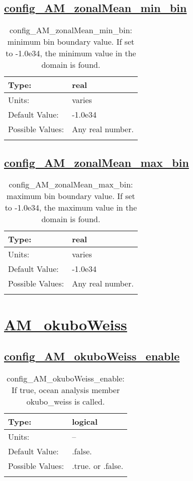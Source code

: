 \subsection[config\_AM\_zonalMean\_min\_bin]{\hyperref[sec:nm_tab_AM_zonalMean]{config\_AM\_zonalMean\_min\_bin}}
\label{subsec:nm_sec_config_AM_zonalMean_min_bin}
\begin{center}
\begin{longtable}{| p{2.0in} || p{4.0in} |}
    \hline
    Type: & real \\
    \hline
    Units: & \si{varies} \\
    \hline
    Default Value: & -1.0e34 \\
    \hline
    Possible Values: & Any real number. \\
    \hline
    \caption{config\_AM\_zonalMean\_min\_bin: minimum bin boundary value.  If set to -1.0e34, the minimum value in the domain is found.}
\end{longtable}
\end{center}
\subsection[config\_AM\_zonalMean\_max\_bin]{\hyperref[sec:nm_tab_AM_zonalMean]{config\_AM\_zonalMean\_max\_bin}}
\label{subsec:nm_sec_config_AM_zonalMean_max_bin}
\begin{center}
\begin{longtable}{| p{2.0in} || p{4.0in} |}
    \hline
    Type: & real \\
    \hline
    Units: & \si{varies} \\
    \hline
    Default Value: & -1.0e34 \\
    \hline
    Possible Values: & Any real number. \\
    \hline
    \caption{config\_AM\_zonalMean\_max\_bin: maximum bin boundary value.  If set to -1.0e34, the maximum value in the domain is found.}
\end{longtable}
\end{center}
\section[AM\_okuboWeiss]{\hyperref[sec:nm_tab_AM_okuboWeiss]{AM\_okuboWeiss}}
\label{sec:nm_sec_AM_okuboWeiss}
\subsection[config\_AM\_okuboWeiss\_enable]{\hyperref[sec:nm_tab_AM_okuboWeiss]{config\_AM\_okuboWeiss\_enable}}
\label{subsec:nm_sec_config_AM_okuboWeiss_enable}
\begin{center}
\begin{longtable}{| p{2.0in} || p{4.0in} |}
    \hline
    Type: & logical \\
    \hline
    Units: & -- \\
    \hline
    Default Value: & .false. \\
    \hline
    Possible Values: & .true. or .false. \\
    \hline
    \caption{config\_AM\_okuboWeiss\_enable: If true, ocean analysis member okubo\_weiss is called.}
\end{longtable}
\end{center}
